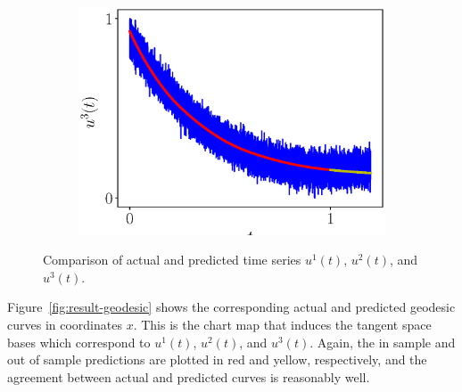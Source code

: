 \documentclass[a4paper,11pt]{elsarticle}
\begin{document}
\begin{figure}[!h]
\begin{subfigure}{0.325\textwidth}
  \end{subfigure}
  \hfill
  \begin{subfigure}{0.325\textwidth}
    \centering
    \includegraphics[width=\linewidth, bb=0 0 461 346, trim={0.2cm 0cm 1.5cm 1cm},clip]{u3-t.eps}
  \end{subfigure}
  
  \caption{Comparison of actual and predicted time series
    $u^{1}(t)$, $u^{2}(t)$, and $u^{3}(t)$.}
  \label{fig:result}
  
\end{figure}

Figure~\ref{fig:result-geodesic} shows the corresponding actual and
predicted geodesic curves in coordinates $x$. This is the chart map
that induces the tangent space bases which correspond to $u^{1}(t)$,
$u^{2}(t)$, and $u^{3}(t)$. Again, the in sample and out of sample
predictions are plotted in red and yellow, respectively, and the
agreement between actual and predicted curves is reasonably well.
\end{document}
